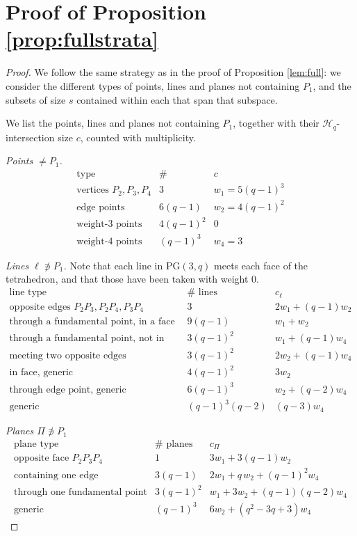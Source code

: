 \documentclass{article}
\newcommand{\PG}{\mathrm{PG}}
\begin{document}
\section{Proof of Proposition \ref{prop:fullstrata}}
\begin{proof}
We follow the same strategy as in the proof of Proposition \ref{lem:full}: we consider the different types of points, lines and planes not containing $P_1$, and the subsets of size $s$ contained within each that span that subspace.

We list the points, lines and planes not containing $P_1$, together with their
$\mathcal H_q$-intersection size $c$, counted with multiplicity.

\emph{Points $\ne P_1$.}
\[
\begin{array}{lcl}
\text{type} & \#\ & c\\\hline
\text{vertices }P_2,P_3,P_4 & 3           & w_1=5(q-1)^3\\
\text{edge points}          & 6(q-1)      & w_2=4(q-1)^2\\
\text{weight-$3$ points}    & 4(q-1)^2    & 0\\
\text{weight-$4$ points}    & (q-1)^3     & w_4=3
\end{array}
\]

\emph{Lines $\ell\not\ni P_1$.} Note that each line in $\PG(3,q)$ meets each face of the tetrahedron, and that those have been taken with weight $0$.
\[
\begin{array}{lcl}
\text{line type} & \#\text{ lines} & c_\ell\\\hline
\text{opposite edges }P_2P_3,P_2P_4,P_3P_4 & 3            & 2w_1+(q-1)w_2\\
\text{through a fundamental point, in a face} & 9(q-1)      & w_1+w_2\\
\text{through a fundamental point, not in face}            & 3(q-1)^2    & w_1+(q-1)w_4\\
\text{meeting two opposite edges}           & 3(q-1)^2    & 2w_2+(q-1)w_4\\
\text{in face, generic}                     & 4(q-1)^2    & 3w_2\\
\text{through edge point, generic}              & 6(q-1)^3    & w_2+(q-2)w_4\\
\text{generic}                              & (q-1)^3(q-2)& (q-3)w_4
\end{array}
\]


\emph{Planes $\Pi\not\ni P_1$}
\[
\begin{array}{lcl}
\text{plane type} & \#\text{ planes} & c_\Pi\\\hline
\text{opposite face }P_2P_3P_4 & 1          & 3w_1+3(q-1)w_2\\
\text{containing one edge}        & 3(q-1)     & 2w_1+q\,w_2+(q-1)^2w_4\\
\text{through one fundamental point}      & 3(q-1)^2   & w_1+3w_2+(q-1)(q-2)w_4\\
\text{generic}       & (q-1)^3    & 6w_2+(q^2-3q+3)w_4
\end{array}
\]



\end{proof}
\end{document}
